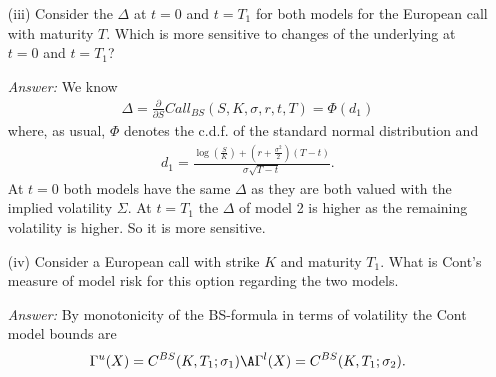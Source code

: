 \documentclass[11pt,a4paper,titlepage]{article}
\begin{document}
\begin{enumerate}
\begin{itemize}
\begin{itemize}
{\it Answer:}
$$
\sigma_1 = \Sigma,
$$
$$
\sigma_2(t) = \sigma_2 \IF_{[0,T_1]}+ \sqrt{\frac{T\Sigma^2 -T_1\sigma_2^2}{T-T_1}}\IF_{]T_1, T]}.
$$
\item[(iii)]
Consider the $\Delta$ at $t=0$ and $t=T_1$ for both models for the European call with maturity $T$. Which is more sensitive to changes of the underlying at $t=0$ and $t=T_1$? 

{\it Answer:}
We know 
\begin{align*}
  \Delta = \frac{\partial}{\partial S}Call_{BS}(S,K,\sigma,r,t,T) = \Phi(d_1)
\end{align*}
where, as usual, $\Phi$ denotes the c.d.f. of the standard normal distribution and
\begin{align*}
  d_1 = \frac{\log \left( \frac{S}{K} \right) + \left( r + \frac{\sigma^2}{2}
  \right)(T-t)}{\sigma \sqrt{T-t}}.
\end{align*}
At $t=0$ both models have the same $\Delta$ as they are both valued with the implied volatility $\Sigma$.
At $t=T_1$ the  $\Delta$ of model 2 is higher as the remaining volatility is higher. So it is more sensitive.  

\item[(iv)]
Consider  a  European call with strike $K$ and maturity $T_1$. What is Cont's measure of model risk for this option regarding the two models. 

{\it Answer:}
By monotonicity of the BS-formula in terms of volatility the Cont model bounds are
$$
\Gamma^u(X)=C^{BS}(K, T_1; \sigma_1)  \A \Gamma^l(X)=C^{BS}(K, T_1; \sigma_2).$$

\end{itemize}
\end{itemize}

\end{enumerate}

\vspace{0.5cm}
\end{document}

